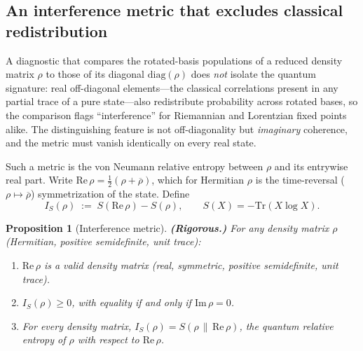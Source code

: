 \documentclass[12pt,a4paper]{article}
\newtheorem{proposition}{Proposition}
\theoremstyle{definition}
\theoremstyle{remark}
\begin{document}
\subsection{An interference metric that excludes classical redistribution}
\label{sec:interference_metric}

A diagnostic that compares the rotated-basis populations of a reduced
density matrix $\rho$ to those of its diagonal $\mathrm{diag}(\rho)$ does
\emph{not} isolate the quantum signature: real off-diagonal elements---the
classical correlations present in any partial trace of a pure state---also
redistribute probability across rotated bases, so the comparison flags
``interference'' for Riemannian and Lorentzian fixed points alike. The
distinguishing feature is not off-diagonality but \emph{imaginary}
coherence, and the metric must vanish identically on every real state.

Such a metric is the von Neumann relative entropy between $\rho$ and its
entrywise real part. Write $\mathrm{Re}\,\rho = \tfrac12(\rho +
\overline{\rho})$, which for Hermitian $\rho$ is the time-reversal
($\rho \mapsto \overline\rho$) symmetrization of the state. Define
\begin{equation}
\label{eq:interference_metric}
  I_S(\rho) \;:=\; S(\mathrm{Re}\,\rho) - S(\rho),
  \qquad S(X) = -\mathrm{Tr}(X \log X).
\end{equation}

\begin{proposition}[Interference metric]
\textbf{(Rigorous.)}
\label{prop:interference_metric}
For any density matrix $\rho$ (Hermitian, positive semidefinite, unit
trace):
\begin{enumerate}
\item[(a)] $\mathrm{Re}\,\rho$ is a valid density matrix (real, symmetric,
positive semidefinite, unit trace).
\item[(b)] $I_S(\rho) \geq 0$, with equality if and only if
$\mathrm{Im}\,\rho = 0$.
\item[(c)] For every density matrix, $I_S(\rho) = S\!\left(\rho \,\|\, \mathrm{Re}\,\rho\right)$,
the quantum relative entropy of $\rho$ with respect to $\mathrm{Re}\,\rho$.
\end{enumerate}
\end{proposition}
\end{document}
